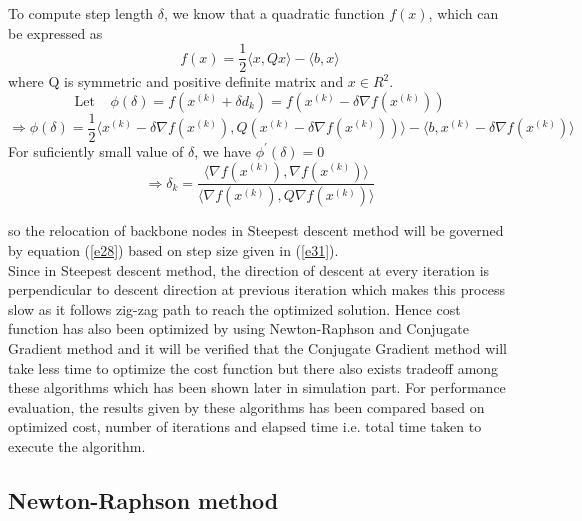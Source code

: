 \documentclass[11pt]{article}
\numberwithin{equation}{section}
\begin{document}
To compute step length $\delta$, we know that a quadratic function $f(x)$, which can be expressed as
 \begin{equation*}
   f(x) = \frac{1}{2}\langle x,Qx\rangle - \langle b,x\rangle
 \end{equation*}where Q is symmetric and positive definite matrix and $x \in R^2.$\\

   \begin{equation*}
 \text{Let}~~~~~\phi(\delta) = f(x^{(k)} + \delta d_k) = f(x^{(k)} - \delta \nabla f(x^{(k)}))
\end{equation*}
\begin{equation*}
 \Rightarrow \phi(\delta) = \frac{1}{2}\langle x^{(k)} - \delta \nabla f(x^{(k)}), Q (x^{(k)} - \delta \nabla f(x^{(k)}))\rangle - \langle b , x^{(k)} - \delta \nabla f(x^{(k)})\rangle
\end{equation*}
For suficiently small value of $\delta$, we have $\phi^{'}(\delta) = 0$\newline
 \begin{equation}\label{e31}
 \Rightarrow \delta_k = \frac{\langle \nabla f(x^{(k)}),\nabla f(x^{(k)})\rangle}{\langle \nabla f(x^{(k)}) , Q \nabla f(x^{(k)})\rangle}
\end{equation}

so the relocation of backbone nodes in Steepest descent method will be governed by equation (\ref{e28}) based on step size given in (\ref{e31}).\\

Since in Steepest descent method, the direction of descent at every iteration is perpendicular to descent direction at previous iteration which makes this process slow as it follows zig-zag path to reach the optimized solution. Hence cost function has also been optimized by using Newton-Raphson and Conjugate Gradient method and it will be verified that the Conjugate Gradient method will take less time to optimize the cost function but there also exists tradeoff among these algorithms which has been shown later in simulation part. For performance evaluation, the results given by these algorithms has been compared based on optimized cost, number of iterations and elapsed time i.e. total time taken to execute the algorithm.

\subsection{Newton-Raphson method }
\end{document}
